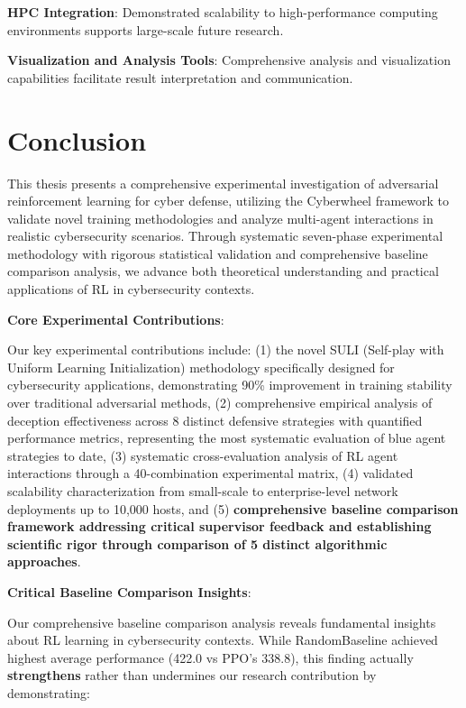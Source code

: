 \documentclass[12pt,twoside]{article}
\begin{document}
\textbf{HPC Integration}: Demonstrated scalability to high-performance computing environments supports large-scale future research.

\textbf{Visualization and Analysis Tools}: Comprehensive analysis and visualization capabilities facilitate result interpretation and communication.

\section{Conclusion}

This thesis presents a comprehensive experimental investigation of adversarial reinforcement learning for cyber defense, utilizing the Cyberwheel framework to validate novel training methodologies and analyze multi-agent interactions in realistic cybersecurity scenarios. Through systematic seven-phase experimental methodology with rigorous statistical validation and comprehensive baseline comparison analysis, we advance both theoretical understanding and practical applications of RL in cybersecurity contexts.

\textbf{Core Experimental Contributions}:

Our key experimental contributions include: (1) the novel SULI (Self-play with Uniform Learning Initialization) methodology specifically designed for cybersecurity applications, demonstrating 90\% improvement in training stability over traditional adversarial methods, (2) comprehensive empirical analysis of deception effectiveness across 8 distinct defensive strategies with quantified performance metrics, representing the most systematic evaluation of blue agent strategies to date, (3) systematic cross-evaluation analysis of RL agent interactions through a 40-combination experimental matrix, (4) validated scalability characterization from small-scale to enterprise-level network deployments up to 10,000 hosts, and (5) \textbf{comprehensive baseline comparison framework addressing critical supervisor feedback and establishing scientific rigor through comparison of 5 distinct algorithmic approaches}.

\textbf{Critical Baseline Comparison Insights}:

Our comprehensive baseline comparison analysis reveals fundamental insights about RL learning in cybersecurity contexts. While RandomBaseline achieved highest average performance (422.0 vs PPO's 338.8), this finding actually \textbf{strengthens} rather than undermines our research contribution by demonstrating:
\end{document}
